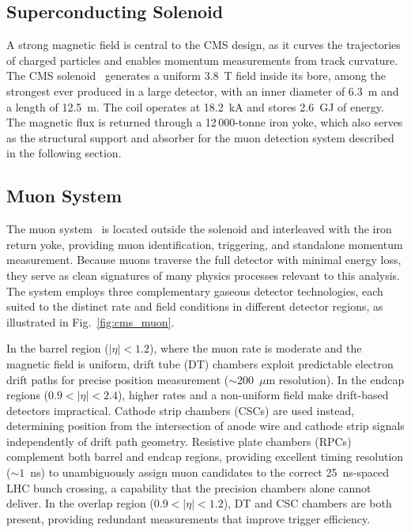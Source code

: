 \subsection*{Superconducting Solenoid}

A strong magnetic field is central to the CMS design, as it curves the trajectories of charged particles and enables momentum measurements from track curvature. The CMS solenoid~\cite{CMS:2009nxa} generates a uniform 3.8~T field inside its bore, among the strongest ever produced in a large detector, with an inner diameter of 6.3~m and a length of 12.5~m. The coil operates at 18.2~kA and stores 2.6~GJ of energy. The magnetic flux is returned through a 12\,000-tonne iron yoke, which also serves as the structural support and absorber for the muon detection system described in the following section.

\subsection*{Muon System}

The muon system~\cite{CMS:2018rym} is located outside the solenoid and interleaved with the iron return yoke, providing muon identification, triggering, and standalone momentum measurement. Because muons traverse the full detector with minimal energy loss, they serve as clean signatures of many physics processes relevant to this analysis. The system employs three complementary gaseous detector technologies, each suited to the distinct rate and field conditions in different detector regions, as illustrated in Fig.~\ref{fig:cms_muon}.

In the barrel region ($|\eta| < 1.2$), where the muon rate is moderate and the magnetic field is uniform, drift tube (DT) chambers exploit predictable electron drift paths for precise position measurement ($\sim$200~$\mu$m resolution). In the endcap regions ($0.9 < |\eta| < 2.4$), higher rates and a non-uniform field make drift-based detectors impractical. Cathode strip chambers (CSCs) are used instead, determining position from the intersection of anode wire and cathode strip signals independently of drift path geometry. Resistive plate chambers (RPCs) complement both barrel and endcap regions, providing excellent timing resolution (${\sim}1$~ns) to unambiguously assign muon candidates to the correct 25~ns-spaced LHC bunch crossing, a capability that the precision chambers alone cannot deliver. In the overlap region ($0.9 < |\eta| < 1.2$), DT and CSC chambers are both present, providing redundant measurements that improve trigger efficiency.

